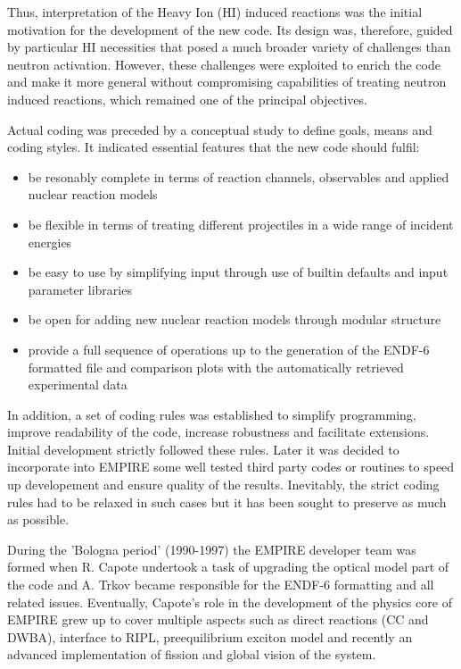 Thus, interpretation of the Heavy Ion (HI) induced reactions was the initial
motivation for the development of the new code. Its design was, therefore,
guided by particular HI necessities that posed a much broader variety of
challenges than neutron activation. However, these challenges were exploited
to enrich the code and make it more general without compromising
capabilities of treating neutron induced reactions, which remained one of
the principal objectives.

Actual coding was preceded by a conceptual study to define goals, means and
coding styles. It indicated essential features that the new code should
fulfil:

\begin{itemize}
\item be resonably complete in terms of reaction channels, observables and
applied nuclear reaction models

\item be flexible in terms of treating different projectiles in a wide range
of incident energies

\item be easy to use by simplifying input through use of builtin defaults
and input parameter libraries

\item be open for adding new nuclear reaction models through modular
structure

\item provide a full sequence of operations up to the generation of the
ENDF-6 formatted file and comparison plots with the automatically retrieved
experimental data
\end{itemize}

In addition, a set of coding rules was established to simplify programming,
improve readability of the code, increase robustness and facilitate
extensions. Initial development strictly followed these rules. Later it was
decided to incorporate into EMPIRE some well tested third party codes or
routines to speed up developement and ensure quality of the results.
Inevitably, the strict coding rules had to be relaxed in such cases but it
has been sought to preserve as much as possible.

During the 'Bologna period' (1990-1997) the EMPIRE developer team was formed
when R. Capote undertook a task of upgrading the optical model part of the
code and A. Trkov became responsible for the ENDF-6 formatting and all
related issues. Eventually, Capote's role in the development of the physics
core of EMPIRE grew up to cover multiple aspects such as direct reactions
(CC and DWBA), interface to RIPL, preequilibrium exciton model and recently
an advanced implementation of fission and global vision of the system.

